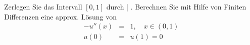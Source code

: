 \begin{aufg}[0]
\label{randwert}
Zerlegen Sie das Intervall $[0,1]$ durch 
| . Berechnen Sie mit Hilfe von 
Finiten Differenzen eine approx. Lösung von
{
\begin{eqnarray*}
-u''(x) & = & 1, \quad x \in (0,1)\\
u(0) & = & u(1) =0
\end{eqnarray*}}
\end{aufg}
